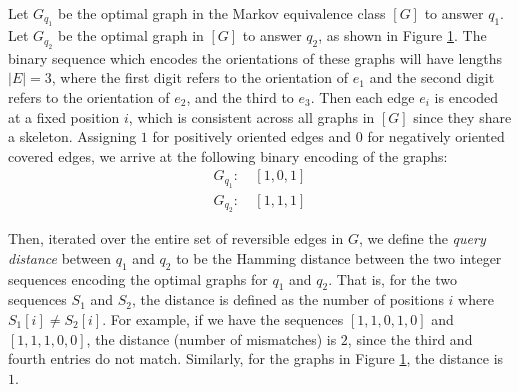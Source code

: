 \begin{example} Let $G_{q_{1}}$ be the optimal graph in the Markov equivalence class $[G]$ to answer $q_{1}$. Let $G_{q_{2}}$ be the optimal graph in $[G]$ to answer $q_{2}$, as shown in Figure \ref{fig:binaryencoding}. \newline
\null \quad \quad The binary sequence which encodes the orientations of these graphs will have lengths $|E| = 3$, where the first digit refers to the orientation of $e_{1}$ and the second digit refers to the orientation of $e_{2}$, and the third to $e_{3}$. Then each edge $e_{i}$ is encoded at a fixed position $i$, which is consistent across all graphs in $[G]$ since they share a skeleton. Assigning $1$ for positively oriented edges and $0$ for negatively oriented covered edges, we arrive at the following binary encoding of the graphs:
\begin{align*}
G_{q_{1}} : & \ [1,0,1]  \\
G_{q_{2}} : & \ [1,1,1]
\end{align*}

\begin{center}
\begin{figure}[h!]
\centering
{}
\caption{}
\label{fig:binaryencoding}
\end{figure}
\end{center}
\end{example}
\null \quad \quad Then, iterated over the entire set of reversible edges in $G$, we define the \textit{query distance} between $q_{1}$ and $q_{2}$ to be the Hamming distance between the two integer sequences encoding the optimal graphs for $q_{1}$ and $q_{2}$. That is, for the two sequences $S_{1}$ and $S_{2}$, the distance is defined as the number of positions $i$ where $S_{1}[i] \neq S_{2}[i]$. \newline
\null \quad \quad For example, if we have the sequences $[1,1,0,1,0]$ and $[1,1,1,0,0]$, the distance (number of mismatches) is $2$, since the third and fourth entries do not match. Similarly, for the graphs in Figure \ref{fig:binaryencoding}, the distance is $1$. 

